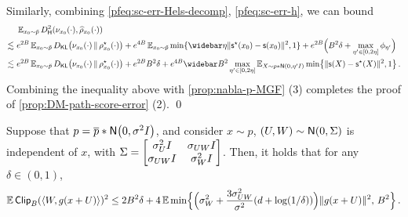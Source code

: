 Similarly, combining \cref{pfeq:sc-err-Hels-decomp}, \cref{pfeq:sc-err-h}, we can bound
\begin{align*}
    &~\En_{\xz\sim \breve p}\Dhels{\piz{\cdot}}{\rhohz{\cdot}} \\
    \leqsim&~ e^{2B}\En_{\xz\sim \breve p}\Dkl{\piz{\cdot}}{\rhosz{\cdot}} 
    +e^{4B} \En_{\xz\sim \breve p}\min\crl{\etabar \nrm{\scfs(\xz)-\scf(\xz)}^2,1}
    +e^{2B}\prn[\Big]{ B^2\delta+\max_{\eta'\in[0,2\eta]} \phi_{\eta'} } \\
    \leqsim&~ e^{2B}\En_{\xz\sim \breve p}\Dkl{\piz{\cdot}}{\rhosz{\cdot}} + e^{2B}B^2\delta+e^{4B} \Bbar^2 \max_{\eta'\in[0,2\eta]}\En_{X\sim \pconv{\eta'}} \minc{ \nrm{\scf(X)-\scfs(X)}^2, 1}\,.
\end{align*}
Combining the inequality above with \cref{prop:nabla-p-MGF} (3) completes the proof of \cref{prop:DM-path-score-error} (2).
\qed

\begin{lemma}\label{lem:scf-err-inner}
Suppose that $p=\pbar*\Nsigma$, and consider $x\sim p$, $(U,W)\sim \normal{0,\Sigma}$ is independent of $x$, with $\Sigma=\begin{bmatrix}
    \sigma_U^2\Id & \sigma_{UW}\Id \\
    \sigma_{UW}\Id & \sigma_W^2\Id
\end{bmatrix}$. Then, it holds that for any $\delta\in(0,1)$,
\begin{align*}
    \En\pclip{\tri{W, g(x+U)}}^2
    \leq 2B^2\delta+4\En\min\crl[\Big]{\prn[\Big]{ \sigma_W^2+\frac{3\sigma_{UW}^2}{\sigma^2}(d+\log(1/\delta)) }\nrm{g(x+U)}^2,\, B^2}\,.
\end{align*}
\end{lemma}

